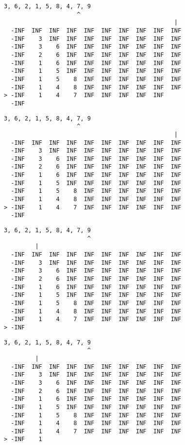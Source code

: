 { \begin{verbatim}
3, 6, 2, 1, 5, 8, 4, 7, 9
                     ^
                                                 |
  -INF  INF  INF  INF  INF  INF  INF  INF  INF  INF
  -INF    3  INF  INF  INF  INF  INF  INF  INF  INF
  -INF    3    6  INF  INF  INF  INF  INF  INF  INF
  -INF    2    6  INF  INF  INF  INF  INF  INF  INF
  -INF    1    6  INF  INF  INF  INF  INF  INF  INF
  -INF    1    5  INF  INF  INF  INF  INF  INF  INF
  -INF    1    5    8  INF  INF  INF  INF  INF  INF
  -INF    1    4    8  INF  INF  INF  INF  INF  INF
> -INF    1    4    7  INF  INF  INF  INF  INF     
  -INF                                             
\end{verbatim} }

{ \begin{verbatim}
3, 6, 2, 1, 5, 8, 4, 7, 9
                     ^
                                                 |
  -INF  INF  INF  INF  INF  INF  INF  INF  INF  INF
  -INF    3  INF  INF  INF  INF  INF  INF  INF  INF
  -INF    3    6  INF  INF  INF  INF  INF  INF  INF
  -INF    2    6  INF  INF  INF  INF  INF  INF  INF
  -INF    1    6  INF  INF  INF  INF  INF  INF  INF
  -INF    1    5  INF  INF  INF  INF  INF  INF  INF
  -INF    1    5    8  INF  INF  INF  INF  INF  INF
  -INF    1    4    8  INF  INF  INF  INF  INF  INF
> -INF    1    4    7  INF  INF  INF  INF  INF  INF
  -INF                                             
\end{verbatim} }

{ \begin{verbatim}
3, 6, 2, 1, 5, 8, 4, 7, 9
                        ^
         |
  -INF  INF  INF  INF  INF  INF  INF  INF  INF  INF
  -INF    3  INF  INF  INF  INF  INF  INF  INF  INF
  -INF    3    6  INF  INF  INF  INF  INF  INF  INF
  -INF    2    6  INF  INF  INF  INF  INF  INF  INF
  -INF    1    6  INF  INF  INF  INF  INF  INF  INF
  -INF    1    5  INF  INF  INF  INF  INF  INF  INF
  -INF    1    5    8  INF  INF  INF  INF  INF  INF
  -INF    1    4    8  INF  INF  INF  INF  INF  INF
  -INF    1    4    7  INF  INF  INF  INF  INF  INF
> -INF                                             
\end{verbatim} }

{ \begin{verbatim}
3, 6, 2, 1, 5, 8, 4, 7, 9
                        ^
         |
  -INF  INF  INF  INF  INF  INF  INF  INF  INF  INF
  -INF    3  INF  INF  INF  INF  INF  INF  INF  INF
  -INF    3    6  INF  INF  INF  INF  INF  INF  INF
  -INF    2    6  INF  INF  INF  INF  INF  INF  INF
  -INF    1    6  INF  INF  INF  INF  INF  INF  INF
  -INF    1    5  INF  INF  INF  INF  INF  INF  INF
  -INF    1    5    8  INF  INF  INF  INF  INF  INF
  -INF    1    4    8  INF  INF  INF  INF  INF  INF
  -INF    1    4    7  INF  INF  INF  INF  INF  INF
> -INF    1                                        
\end{verbatim} }

